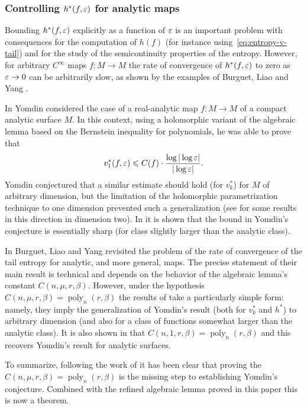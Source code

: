 \documentclass[reqno]{amsart}
\renewcommand\~[1]{\widetilde{#1}}
\def\poly{\operatorname{poly}} \def\J{\operatorname{J}}
\begin{document}
\subsubsection{Controlling $h^*(f,\varepsilon)$ for analytic maps}

Bounding $h^*(f,\varepsilon)$ explicitly as a function of $\varepsilon$ is an important
problem with consequences for the computation of $h(f)$ (for instance
using~\eqref{eq:entropy-v-tail}) and for the study of the
semicontinuity properties of the entropy. However, for arbitrary
$C^\infty$ maps $f:M\to M$ the rate of convergence of $h^*(f,\varepsilon)$ to
zero as $\varepsilon\to0$ can be arbitrarily slow, as shown by the examples of
Burguet, Liao and Yang \cite[Theorem~L]{bly}.

In \cite{yomdin:entropy-analytic} Yomdin considered the case of a
real-analytic map $f:M\to M$ of a compact analytic surface $M$. In
this context, using a holomorphic variant of the algebraic lemma based
on the Bernstein inequality for polynomials, he was able to prove that
\begin{equation}
  v_1^*(f,\varepsilon)\leqslant C(f)\cdot \frac{\log|\log\varepsilon|}{|\log\varepsilon|}.
\end{equation}
Yomdin conjectured \cite[Conjecture~6.1]{yomdin:entropy-analytic} that
a similar estimate should hold (for $v^*_k$) for $M$ of arbitrary
dimension, but the limitation of the holomorphic parametrization
technique to one dimension prevented such a generalization (see
\cite{yomdin:param-dim2} for some results in this direction in
dimension two). In \cite[Theorem~N]{bly} it is shown that the bound in
Yomdin's conjecture is essentially sharp (for class slightly larger
than the analytic class).

In \cite{bly} Burguet, Liao and Yang revisited the problem of the rate
of convergence of the tail entropy for analytic, and more general,
maps. The precise statement of their main result is technical and
depends on the behavior of the algebraic lemma's constant
$C(n,\mu,r,\beta)$. However, under the hypothesis
$C(n,\mu,r,\beta)=\poly_n(r,\beta)$ the results of
\cite[Corollary~B]{bly} take a particularly simple form: namely, they
imply the generalization of Yomdin's result (both for $v^*_k$ and
$h^*$) to arbitrary dimension (and also for a class of functions
somewhat larger than the analytic class). It is also shown in
\cite{bly} that $C(n,1,r,\beta)=\poly_n(r,\beta)$ and this recovers
Yomdin's result for analytic surfaces.

To summarize, following the work of \cite{bly} it has been clear that
proving the $C(n,\mu,r,\beta)=\poly_n(r,\beta)$ is the missing step to
establishing Yomdin's conjecture. Combined with the refined algebraic
lemma proved in this paper this is now a theorem.
\end{document}
